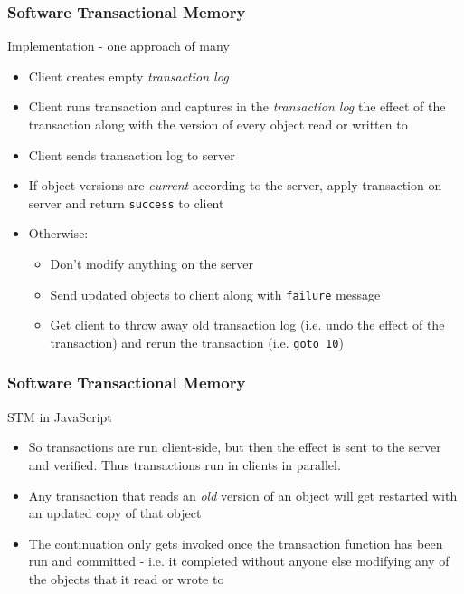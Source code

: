 \documentclass{beamer}
\begin{document}
\begin{frame}
  \frametitle{Software Transactional Memory}

  \begin{block}{Implementation - one approach of many}
    \begin{itemize}
    \item
      Client creates empty {\em transaction log}
    \item
      Client runs transaction and captures in the {\em transaction
        log} the effect of the transaction along with the version of
      every object read or written to
    \item
      Client sends transaction log to server
    \item
      If object versions are {\em current} according to the server,
      apply transaction on server and return \texttt{success} to
      client
    \item
      Otherwise:
      \begin{itemize}
        \item
          Don't modify anything on the server
        \item
          Send updated objects to client along with \texttt{failure} message
        \item
          Get client to throw away old transaction log (i.e. undo the
          effect of the transaction) and rerun the transaction
          (i.e. \texttt{goto 10})
      \end{itemize}
    \end{itemize}
  \end{block}
\end{frame}

\begin{frame}
  \frametitle{Software Transactional Memory}

  \begin{block}{STM in JavaScript}
    \begin{itemize}
    \item
      So transactions are run client-side, but then the effect is sent
      to the server and verified. Thus transactions run in clients in
      parallel.
    \item
      Any transaction that reads an {\em old} version of an object
      will get restarted with an updated copy of that object
    \item
      The continuation only gets invoked once the transaction function
      has been run and committed - i.e. it completed without anyone
      else modifying any of the objects that it read or wrote to
    \end{itemize}
  \end{block}
\end{frame}
\end{document}
